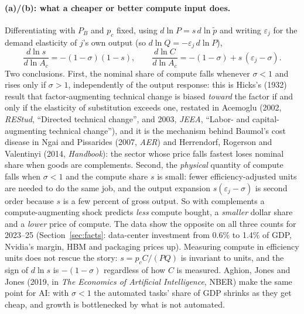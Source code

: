 \documentclass[11pt]{article}
\begin{document}
\paragraph{(a)/(b): what a cheaper or better compute input does.} Differentiating with $P_B$ and $p_c$ fixed, using $d\ln P = s\, d\ln\tilde p$ and writing $\varepsilon_j$ for the demand elasticity of $j$'s own output (so $d\ln Q = -\varepsilon_j\, d\ln P$),
\[
\frac{d\ln s}{d\ln A_c} = -(1-\sigma)(1-s),
\qquad
\frac{d\ln C}{d\ln A_c} = -(1-\sigma) + s\,(\varepsilon_j - \sigma).
\]
Two conclusions. First, the nominal share of compute falls whenever $\sigma<1$ and rises only if $\sigma>1$, independently of the output response: this is Hicks's (1932) result that factor-augmenting technical change is biased \emph{toward} the factor if and only if the elasticity of substitution exceeds one, restated in Acemoglu (2002, \emph{REStud}, ``Directed technical change'', and 2003, \emph{JEEA}, ``Labor- and capital-augmenting technical change''), and it is the mechanism behind Baumol's cost disease in Ngai and Pissarides (2007, \emph{AER}) and Herrendorf, Rogerson and Valentinyi (2014, \emph{Handbook}): the sector whose price falls fastest loses nominal share when goods are complements. Second, the \emph{physical} quantity of compute falls when $\sigma<1$ and the compute share $s$ is small: fewer efficiency-adjusted units are needed to do the same job, and the output expansion $s(\varepsilon_j-\sigma)$ is second order because $s$ is a few percent of gross output. So with complements a compute-augmenting shock predicts \emph{less} compute bought, a \emph{smaller} dollar share and a \emph{lower} price of compute. The data show the opposite on all three counts for 2023--25 (Section~\ref{sec:facts}: data-center investment from 0.6\% to 1.4\% of GDP, Nvidia's margin, HBM and packaging prices up). Measuring compute in efficiency units does not rescue the story: $s = p_c C/(PQ)$ is invariant to units, and the sign of $d\ln s$ is $-(1-\sigma)$ regardless of how $C$ is measured. Aghion, Jones and Jones (2019, in \emph{The Economics of Artificial Intelligence}, NBER) make the same point for AI: with $\sigma<1$ the automated tasks' share of GDP shrinks as they get cheap, and growth is bottlenecked by what is not automated.
\end{document}
